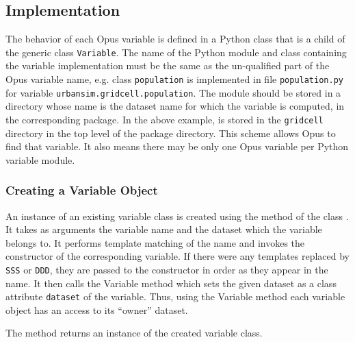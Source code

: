 {\subsection{Implementation}
\label{sec:variable-implementation}
%
The behavior of each Opus variable \variablesindex is defined in a Python \pythonindex class that is a
child of the generic class \verb|Variable|. \variablesindex The name of the Python \pythonindex module and
class containing the variable \variablesindex implementation must be the same as the
un-qualified part of the Opus variable \variablesindex name, e.g. class \verb|population| is
implemented in file \verb|population.py| for variable \variablesindex
\verb|urbansim.gridcell.population|. The module should be stored in a
directory whose name is the dataset \datasetindex name for which the variable \variablesindex is computed,
in the corresponding package. In the above example,  is
stored in the \verb|gridcell| directory in the top level of the
 package directory.  This scheme allows Opus to find that
variable. \variablesindex  It also means there may be only one Opus variable per Python \pythonindex
variable \variablesindex module.

\subsubsection{Creating a Variable Object}
\variablesindex{}
%
An instance of an existing variable class is
created using the method
 \variablesindex{}of the
class .  It takes as arguments
the variable \variablesindex name and the dataset \datasetindex which the variable \variablesindex belongs to. It performs
template matching of the name and invokes the constructor of the corresponding
variable. \variablesindex If there were any templates replaced by \verb|SSS| or \verb|DDD|,
they are passed to the constructor in order as they appear in the name. It
then calls the Variable \variablesindex method  \datasetindex which sets the given
dataset \datasetindex as a class attribute \attributesindex \verb|dataset| \datasetindex of the variable. \variablesindex Thus, using the
Variable \variablesindex method  \datasetindex each variable \variablesindex object has an access to
its ``owner'' dataset. \datasetindex

The  method  \variablesindex returns an instance
of the created variable \variablesindex class.

}

